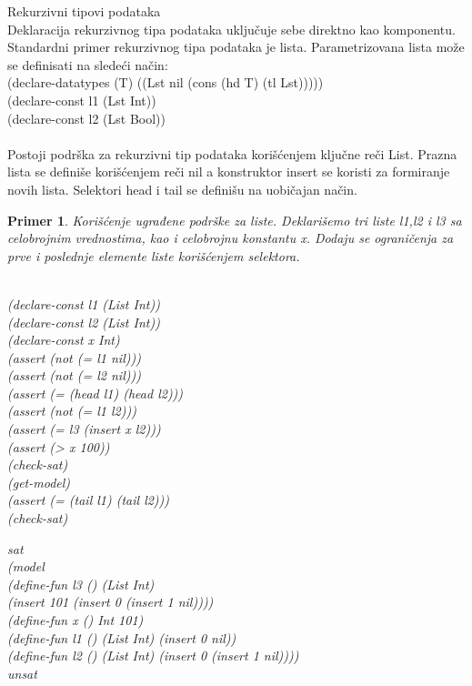 \documentclass[12pt,oneside]{memoir}
\newtheorem{primer}{Primer}
\begin{document}
Rekurzivni tipovi podataka
\\
Deklaracija rekurzivnog tipa podataka uključuje sebe direktno kao komponentu. Standardni primer rekurzivnog tipa podataka je lista. Parametrizovana lista može se definisati na sledeći način:\\
(declare-datatypes (T) ((Lst nil (cons (hd T) (tl Lst)))))
\\(declare-const l1 (Lst Int))
\\(declare-const l2 (Lst Bool))
\\ \\
Postoji podrška za rekurzivni tip podataka korišćenjem ključne reči List. 
Prazna lista se definiše korišćenjem reči nil a konstruktor insert se koristi za formiranje novih lista. Selektori head i tail se definišu na uobičajan način.
\\
\begin{primer} Korišćenje ugrađene podrške za liste. Deklarišemo tri liste l1,l2 i l3 sa celobrojnim vrednostima, kao i celobrojnu konstantu x. Dodaju se ograničenja za prve i poslednje elemente liste korišćenjem selektora. 
\\ \\
\begin{minipage}[b]{0.5\textwidth}
(declare-const l1 (List Int))
\\(declare-const l2 (List Int))
\\(declare-const x Int)
\\(assert (not (= l1 nil)))
\\(assert (not (= l2 nil)))
\\(assert (= (head l1) (head l2)))
\\(assert (not (= l1 l2)))
\\(assert (= l3 (insert x l2)))
\\(assert (> x 100))
\\(check-sat)
\\(get-model)
\\(assert (= (tail l1) (tail l2)))
\\(check-sat)
\end{minipage}
\begin{minipage}[t]{0.5\textwidth}
\vspace{-7.8cm}
sat 
\\(model 
\\(define-fun l3 () (List Int) 
\\(insert 101 (insert 0 (insert 1 nil)))) 
\\(define-fun x () Int 101) 
\\(define-fun l1 () (List Int) (insert 0 nil)) 
\\(define-fun l2 () (List Int) (insert 0 (insert 1 nil)))) 
\\unsat
\end{minipage}


\end{primer}
\end{document}
